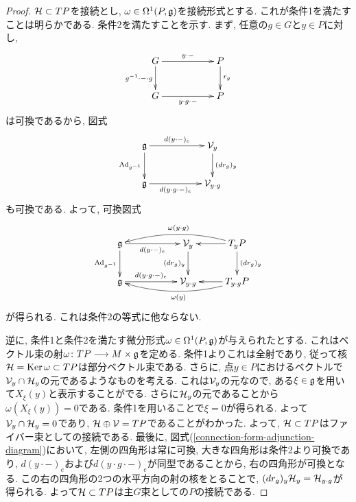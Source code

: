 \begin{proof}
$\mathcal{H} \subset TP$を接続とし, $\omega \in \Omega^1(P, \mathfrak{g})$を接続形式とする.
これが条件1を満たすことは明らかである.
条件2を満たすことを示す.
まず, 任意の$g \in G$と$y \in P$に対し,
\begin{equation}
\xymatrix{
G \ar[d]_-{g^{-1} \cdot - \cdot g} \ar[rr]^-{y \cdot -} && P \ar[d]^-{r_g} \\
G \ar[rr]_-{y \cdot g \cdot -} && P
}
\end{equation}
は可換であるから, 図式
\begin{equation}
\xymatrix{
\frakg \ar[d]_-{\Ad_{g^{-1}}} \ar[rr]^-{d(y \cdot -)_e} && \calV_y \ar[d]^-{(dr_g)_y} \\
\frakg \ar[rr]_-{d(y \cdot g \cdot -)_e} && \calV_{y \cdot g}
}
\end{equation}
も可換である.
よって, 可換図式
\begin{equation}
\label{connection-form-adjunction-diagram}
\xymatrix{
\frakg \ar[d]_-{\Ad_{g^{-1}}} \ar[rr]_-{d(y \cdot -)_e} && \calV_y \ar[d]_-{(dr_g)_y} & T_yP \ar[d]^-{(dr_g)_y} \ar[l] \ar@/_10pt/[lll]_{\omega(y \cdot g)}\\
\frakg \ar[rr]^-{d(y \cdot g \cdot -)_e} && \calV_{y \cdot g} & T_{y \cdot g}P \ar[l] \ar@/^10pt/[lll]^{\omega(y)}
}
\end{equation}
が得られる.
これは条件2の等式に他ならない.

逆に, 条件1と条件2を満たす微分形式$\omega \in \Omega^1(P, \mathfrak{g})$が与えられたとする.
これはベクトル束の射$\omega \colon TP \longrightarrow M \times \mathfrak{g}$を定める.
条件1よりこれは全射であり, 従って核$\mathcal{H} = \operatorname{Ker} \omega \subset TP$は部分ベクトル束である.
さらに, 点$y \in P$におけるベクトルで$\mathcal{V}_y \cap \mathcal{H}_y$の元であるようなものを考える.
これは$\mathcal{V}_y$の元なので, ある$\xi \in \mathfrak{g}$を用いて$X_{\xi}(y)$と表示することがでる.
さらに$\mathcal{H}_y$の元であることから$\omega(X_{\xi}(y)) = 0$である.
条件1を用いることで$\xi = 0$が得られる.
よって$\mathcal{V}_y \cap \mathcal{H}_y = 0$であり, $\mathcal{H} \oplus \mathcal{V} = TP$であることがわかった.
よって, $\mathcal{H} \subset TP$はファイバー束としての接続である.
最後に, 図式(\ref{connection-form-adjunction-diagram})において, 左側の四角形は常に可換, 大きな四角形は条件2より可換であり, $d(y \cdot -)_e$および$d(y\cdot g \cdot -)_e$が同型であることから, 右の四角形が可換となる.
この右の四角形の2つの水平方向の射の核をとることで, $(dr_g)_y \mathcal{H}_y = \mathcal{H}_{y \cdot g}$が得られる.
よって$\mathcal{H} \subset TP$は主$G$束としての$P$の接続である.
\end{proof}

